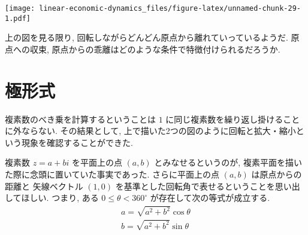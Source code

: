 \documentclass[a4paper]{scrbook}
\newenvironment{Shaded}{\begin{snugshade}}{\end{snugshade}}
\newcommand{\KeywordTok}[1]{\textcolor[rgb]{0.13,0.29,0.53}{\textbf{{#1}}}}
\newcommand{\DataTypeTok}[1]{\textcolor[rgb]{0.13,0.29,0.53}{{#1}}}
\newcommand{\DecValTok}[1]{\textcolor[rgb]{0.00,0.00,0.81}{{#1}}}
\newcommand{\FloatTok}[1]{\textcolor[rgb]{0.00,0.00,0.81}{{#1}}}
\newcommand{\StringTok}[1]{\textcolor[rgb]{0.31,0.60,0.02}{{#1}}}
\newcommand{\NormalTok}[1]{{#1}}
\theoremstyle{definition}
\begin{document}
\begin{Shaded}
\end{Shaded}

\texttt{[image: linear-economic-dynamics\_files/figure-latex/unnamed-chunk-29-1.pdf]}

上の図を見る限り, 回転しながらどんどん原点から離れていっているようだ.
原点への収束, 原点からの乖離はどのような条件で特徴付けられるだろうか.

\section{極形式}

複素数のべき乗を計算するということは \(1\)
に同じ複素数を繰り返し掛けることに外ならない. その結果として,
上で描いた2つの図のように回転と拡大・縮小という現象を確認することができた.

複素数 \(z = a + bi\) を平面上の点 \((a, b)\) とみなせるというのが,
複素平面を描いた際に念頭に置いていた事実であった. さらに平面上の点
\((a, b)\) は原点からの距離と 矢線ベクトル \((1, 0)\)
を基準とした回転角で表せるということを思い出してほしい. つまり, ある
\(0 \le \theta < 360^\circ\) が存在して次の等式が成立する. \[
\begin{aligned}
  a = \sqrt{a^2 + b^2} \cos \theta\\
  b = \sqrt{a^2 + b^2} \sin \theta\\
\end{aligned}
\]
\end{document}
